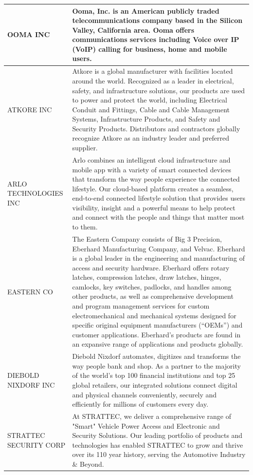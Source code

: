 \begin{tabular}{>{\raggedright\arraybackslash}p{3.5cm}>{\raggedright\arraybackslash}p{20cm}}
   \midrule
OOMA INC & Ooma, Inc. is an American publicly traded telecommunications company based in the Silicon Valley, California area. Ooma offers communications services including Voice over IP (VoIP) calling for business, home and mobile users. \\ 
   \midrule
ATKORE INC & Atkore is a global manufacturer with facilities located around the world. Recognized as a leader in electrical, safety, and infrastructure solutions, our products are used to power and protect the world, including Electrical Conduit and Fittings, Cable and Cable Management Systems, Infrastructure Products, and Safety and Security Products. Distributors and contractors globally recognize Atkore as an industry leader and preferred supplier. \\ 
   \midrule
ARLO TECHNOLOGIES INC & Arlo combines an intelligent cloud infrastructure and mobile app with a variety of smart connected devices that transform the way people experience the connected lifestyle. Our cloud-based platform creates a seamless, end-to-end connected lifestyle solution that provides users visibility, insight and a powerful means to help protect and connect with the people and things that matter most to them. \\ 
   \midrule
EASTERN CO & The Eastern Company consists of Big 3 Precision, Eberhard Manufacturing Company, and Velvac. Eberhard is a global leader in the engineering and manufacturing of access and security hardware. Eberhard offers rotary latches, compression latches, draw latches, hinges, camlocks, key switches, padlocks, and handles among other products, as well as comprehensive development and program management services for custom electromechanical and mechanical systems designed for specific original equipment manufacturers (“OEMs”) and customer applications. Eberhard’s products are found in an expansive range of applications and products globally. \\ 
   \midrule
DIEBOLD NIXDORF INC & Diebold Nixdorf automates, digitizes and transforms the way people bank and shop. As a partner to the majority of the world’s top 100 financial institutions and top 25 global retailers, our integrated solutions connect digital and physical channels conveniently, securely and efficiently for millions of customers every day. \\ 
   \midrule
STRATTEC SECURITY CORP & At STRATTEC, we deliver a comprehensive range of "Smart" Vehicle Power Access and Electronic and Security Solutions. Our leading portfolio of products and technologies has enabled STRATTEC to grow and thrive over its 110 year history, serving the Automotive Industry \& Beyond. \\ 

\end{tabular}
